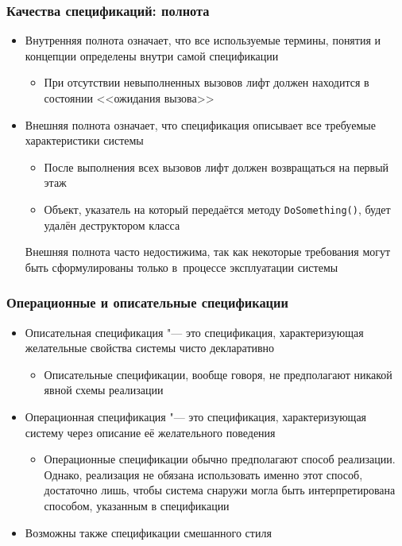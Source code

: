 \documentclass{softengineering-lectures}
\begin{document}
\begin{frame} \frametitle{Качества спецификаций: полнота}

  \begin{itemize}
  \item \alert{Внутренняя полнота} означает, что все используемые термины,
    понятия и концепции определены внутри самой спецификации
    \begin{itemize}
    \item При отсутствии невыполненных вызовов лифт должен находится в \alert{состоянии
      <<ожидания вызова>>}
    \end{itemize}
  \item \alert{Внешняя полнота} означает, что спецификация описывает все
    \alert{требуемые} характеристики системы
    \begin{itemize}
    \item После выполнения всех вызовов лифт должен возвращаться на первый этаж
    \item Объект, указатель на который передаётся методу \texttt{DoSomething()},
      будет удалён деструктором класса
    \end{itemize}
    Внешняя полнота часто недостижима, так как некоторые требования могут быть
    сформулированы только в~процессе эксплуатации системы
  \end{itemize}
  
\end{frame}

\begin{frame} \frametitle{Операционные и описательные спецификации}

  \begin{itemize}
  \item \alert{Описательная спецификация} "--- это спецификация, характеризующая
    \alert{желательные свойства} системы чисто декларативно
    \begin{itemize}
    \item Описательные спецификации, вообще говоря, не предполагают никакой явной
      схемы реализации
    \end{itemize}
  \item \alert{Операционная спецификация} "--- это спецификация, характеризующая
    систему через описание её \alert{желательного поведения}
    \begin{itemize}
    \item Операционные спецификации обычно предполагают способ
      реализации. Однако, реализация \alert{не обязана использовать именно этот
        способ}, достаточно лишь, чтобы система \alert{снаружи могла быть интерпретирована}
      способом, указанным в спецификации
    \end{itemize}
  \item Возможны также спецификации смешанного стиля
  \end{itemize}
  
\end{frame}
\end{document}
